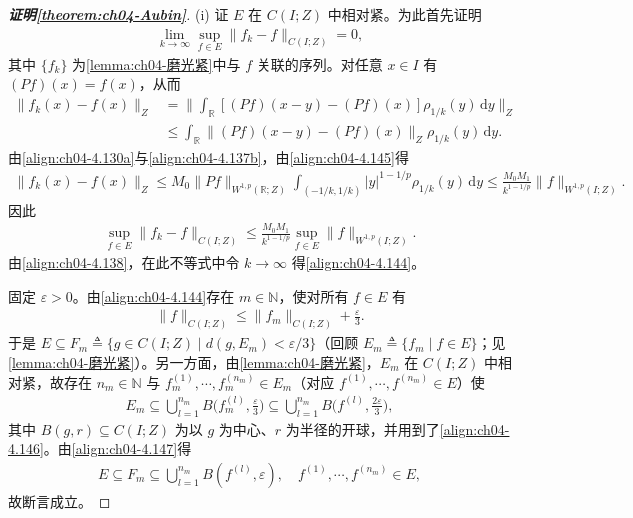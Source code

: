 \documentclass[../../main.tex]{subfiles}%
\begin{document}
\begin{proof}[\textbf{证明\cref{theorem:ch04-Aubin}}]
(i) 证 $E$ 在 $C(I;Z)$ 中相对紧。为此首先证明
\begin{align}
\lim_{k\to\infty}\sup_{f\in E}\|f_k-f\|_{C(I;Z)}=0, \label{align:ch04-4.144}
\end{align}
其中 $\{f_k\}$ 为\cref{lemma:ch04-磨光紧}中与 $f$ 关联的序列。对任意 $x\in I$ 有 $(Pf)(x)=f(x)$，从而
\begin{align}
\|f_k(x)-f(x)\|_Z&=\Big\|\int_{\mathbb{R}}[(Pf)(x-y)-(Pf)(x)]\rho_{1/k}(y)\,\mathrm{d}y\Big\|_Z\nonumber\\
&\leqslant\int_{\mathbb{R}}\|(Pf)(x-y)-(Pf)(x)\|_Z\rho_{1/k}(y)\,\mathrm{d}y. \label{align:ch04-4.145}
\end{align}
由\eqref{align:ch04-4.130a}与\eqref{align:ch04-4.137b}，由\eqref{align:ch04-4.145}得
\begin{align*}
\|f_k(x)-f(x)\|_Z\leqslant M_0\|Pf\|_{W^{1,p}(\mathbb{R};Z)}\int_{(-1/k,1/k)}|y|^{1-1/p}\rho_{1/k}(y)\,\mathrm{d}y
\leqslant\frac{M_0M_1}{k^{1-1/p}}\|f\|_{W^{1,p}(I;Z)}.
\end{align*}
因此
\begin{align*}
\sup_{f\in E}\|f_k-f\|_{C(I;Z)}\leqslant\frac{M_0M_1}{k^{1-1/p}}\sup_{f\in E}\|f\|_{W^{1,p}(I;Z)}.
\end{align*}
由\eqref{align:ch04-4.138}，在此不等式中令 $k\to\infty$ 得\eqref{align:ch04-4.144}。

固定 $\varepsilon>0$。由\eqref{align:ch04-4.144}存在 $m\in\mathbb{N}$，使对所有 $f\in E$ 有
\begin{align}
\|f\|_{C(I;Z)}\leqslant\|f_m\|_{C(I;Z)}+\frac{\varepsilon}{3}. \label{align:ch04-4.146}
\end{align}
于是 $E\subseteq F_m\triangleq\{g\in C(I;Z)\mid d(g,E_m)<\varepsilon/3\}$（回顾 $E_m\triangleq\{f_m\mid f\in E\}$；见\cref{lemma:ch04-磨光紧}）。另一方面，由\cref{lemma:ch04-磨光紧}，$E_m$ 在 $C(I;Z)$ 中相对紧，故存在 $n_m\in\mathbb{N}$ 与 $f_m^{(1)},\cdots ,f_m^{(n_m)}\in E_m$（对应 $f^{(1)},\cdots ,f^{(n_m)}\in E$）使
\begin{align}
E_m\subseteq\bigcup_{l=1}^{n_m}B\Big(f_m^{(l)},\frac{\varepsilon}{3}\Big)\subseteq\bigcup_{l=1}^{n_m}B\Big(f^{(l)},\frac{2\varepsilon}{3}\Big), \label{align:ch04-4.147}
\end{align}
其中 $B(g,r)\subseteq C(I;Z)$ 为以 $g$ 为中心、$r$ 为半径的开球，并用到了\eqref{align:ch04-4.146}。由\eqref{align:ch04-4.147}得
\begin{align*}
E\subseteq F_m\subseteq\bigcup_{l=1}^{n_m}B(f^{(l)},\varepsilon),\quad f^{(1)},\cdots ,f^{(n_m)}\in E,
\end{align*}
故断言成立。


\end{proof}
\end{document}
